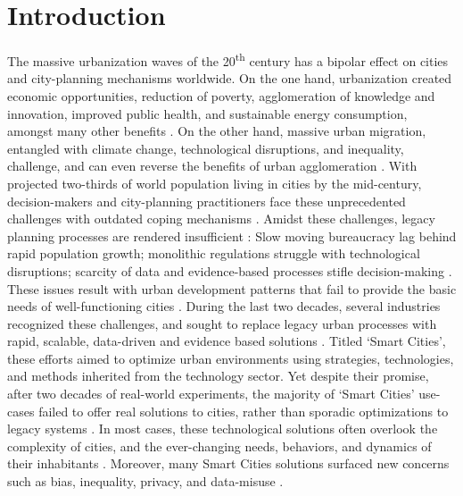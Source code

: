\chapter*{Introduction}\label{chapter:introduction}

{
    The massive urbanization waves of the 20\textsuperscript{th} century has a bipolar effect on cities and city-planning mechanisms worldwide. On the one hand, urbanization created economic opportunities, reduction of poverty, agglomeration of knowledge and innovation, improved public health, and sustainable energy consumption, amongst many other benefits \cite{Glaeser2011, reckien2017climate, banerjee2011companion}. On the other hand, massive urban migration, entangled with climate change, technological disruptions, and inequality, challenge, and can even reverse the benefits of urban agglomeration \cite{parnell2016defining, reckien2017climate}. With projected two-thirds of world population living in cities by the mid-century, decision-makers and city-planning practitioners face these unprecedented challenges with outdated coping mechanisms \cite{united2018world, UnitedNationsHabitatIII2017}. Amidst these challenges, legacy planning processes are rendered insufficient \cite{Ben-Joseph2004, green2019smart, gaffney2018smarter}: Slow moving bureaucracy lag behind rapid population growth; monolithic regulations struggle with technological disruptions; scarcity of data and evidence-based processes stifle decision-making \cite{world2016inspiring, grauman1976orders, chen2014global}. These issues result with urban development patterns that fail to provide the basic needs of well-functioning cities \cite{Glaeser2011, banerjee2011companion}.
    \newline
    During the last two decades, several industries recognized these challenges, and sought to replace legacy urban processes with rapid, scalable, data-driven and evidence based solutions \cite{green2019smart, soderstrom2014smart}. Titled `Smart Cities', these efforts aimed to optimize urban environments using strategies, technologies, and methods inherited from the technology sector. Yet despite their promise, after two decades of real-world experiments, the majority of `Smart Cities' use-cases failed to offer real solutions to cities, rather than sporadic optimizations to legacy systems \cite{green2019smart, Hollands2008}. In most cases, these technological solutions often overlook the complexity of cities, and the ever-changing needs, behaviors, and dynamics of their inhabitants \cite{gaffney2018smarter}. Moreover, many Smart Cities solutions surfaced new concerns such as bias, inequality, privacy, and data-misuse \cite{green2019smart, Hollands2008}.
}
